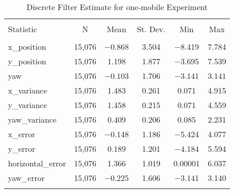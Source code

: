 
\begin{table}[h] \centering 
  \caption{Discrete Filter Estimate for one-mobile Experiment} 
  \label{tab:one_mobile_discrete_summary} 
\begin{tabular}{@{\extracolsep{5pt}}lccccc} 
\\[-1.8ex]\hline 
\hline \\[-1.8ex] 
Statistic & \multicolumn{1}{c}{N} & \multicolumn{1}{c}{Mean} & \multicolumn{1}{c}{St. Dev.} & \multicolumn{1}{c}{Min} & \multicolumn{1}{c}{Max} \\ 
\hline \\[-1.8ex] 
x\_position & 15,076 & $-$0.868 & \num{3.504} & $-$8.419 & \num{7.784} \\ 
y\_position & 15,076 & \num{1.198} & \num{1.877} & $-$3.695 & \num{7.539} \\ 
yaw & 15,076 & $-$0.103 & \num{1.706} & $-$3.141 & \num{3.141} \\ 
x\_variance & 15,076 & \num{1.483} & \num{0.261} & \num{0.071} & \num{4.915} \\ 
y\_variance & 15,076 & \num{1.458} & \num{0.215} & \num{0.071} & \num{4.559} \\ 
yaw\_variance & 15,076 & \num{0.409} & \num{0.206} & \num{0.085} & \num{2.231} \\ 
x\_error & 15,076 & $-$0.148 & \num{1.186} & $-$5.424 & \num{4.077} \\ 
y\_error & 15,076 & \num{0.189} & \num{1.201} & $-$4.184 & \num{5.594} \\ 
horizontal\_error & 15,076 & \num{1.366} & \num{1.019} & \num{0.00001} & \num{6.037} \\ 
yaw\_error & 15,076 & $-$0.225 & \num{1.606} & $-$3.141 & \num{3.140} \\ 
\hline \\[-1.8ex] 
\end{tabular} 
\end{table} 
